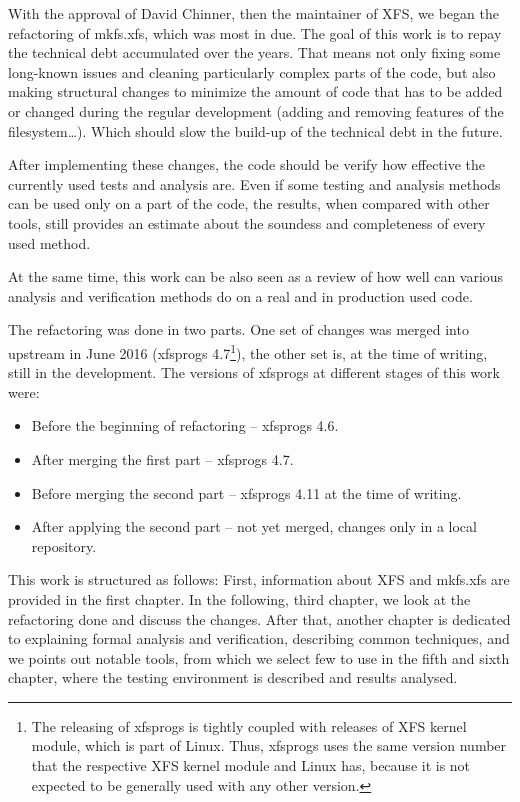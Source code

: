 With the approval of David Chinner, then the maintainer of XFS, we began the
refactoring of mkfs.xfs, which was most in due. The goal of this work is to
repay the technical debt accumulated over the years. That means not only
fixing some long-known issues and cleaning particularly complex parts of
the code, but also making structural changes to minimize the amount of code
that has to be added or changed during the regular development (adding and
removing features of the filesystem\ldots). Which should slow the build-up
of the technical debt in the future.

After implementing these changes, the code should be verify how effective
the currently used tests and analysis are. Even if some testing and
analysis methods can be used only on a part of the code, the results, when
compared with other tools, still provides an estimate about the soundess
and completeness of every used method.

At the same time, this work can be also seen as a review of how well can
various analysis and verification methods do on a real and in production
used code.

The refactoring was done in two parts. One set of changes was merged into
upstream in June 2016 (xfsprogs 4.7\footnote{The releasing of xfsprogs is
		tightly coupled with releases of XFS kernel module, which
		is part of Linux. Thus, xfsprogs uses the same version
		number that the respective XFS kernel module and Linux has,
because it is not expected to be generally used with any other version.}),
the other set is, at the time of writing, still in the development. The
versions of xfsprogs at different stages of this work were:
\begin{itemize}
\item Before the beginning of refactoring -- xfsprogs 4.6.
\item After merging the first part -- xfsprogs 4.7.
\item Before merging the second part -- xfsprogs 4.11 at the time of writing.
\item After applying the second part -- not yet merged, changes only in a local repository.
\end{itemize}

This work is structured as follows: First, information about XFS and
mkfs.xfs are provided in the first chapter. In the following, third chapter, we look
at the refactoring done and discuss the changes. After that, another
chapter is dedicated to explaining formal analysis and verification,
describing common techniques, and we points out notable tools, from which
we select few to use in the fifth and sixth chapter, where the testing
environment is described and results analysed.

